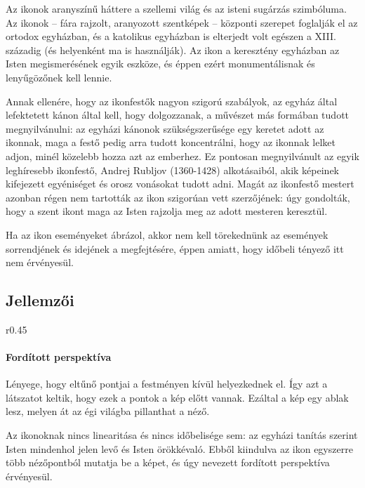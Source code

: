 Az ikonok aranyszínű háttere a szellemi világ és az isteni sugárzás szimbóluma. Az ikonok – fára rajzolt, aranyozott szentképek – központi szerepet foglalják el az ortodox egyházban, és a katolikus egyházban is elterjedt volt egészen a XIII. századig (és helyenként ma is használják). Az ikon a keresztény egyházban az Isten megismerésének egyik eszköze, és éppen ezért monumentálisnak és lenyűgözőnek kell lennie.

Annak ellenére, hogy az ikonfestők nagyon szigorú szabályok, az egyház által lefektetett kánon által kell, hogy dolgozzanak, a művészet más formában tudott megnyilvánulni: az egyházi kánonok szükségszerűsége egy keretet adott az ikonnak, maga a festő pedig arra tudott koncentrálni, hogy az ikonnak lelket adjon, minél közelebb hozza azt az emberhez. Ez pontosan megnyilvánult az egyik leghíresebb ikonfestő, Andrej Rubljov (1360-1428) alkotásaiból, akik képeinek kifejezett egyéniséget és orosz vonásokat tudott adni. Magát az ikonfestő mestert azonban régen nem tartották az ikon szigorúan vett szerzőjének: úgy gondolták, hogy a szent ikont maga az Isten rajzolja meg az adott mesteren keresztül.

Ha az ikon eseményeket ábrázol, akkor nem kell törekednünk az események sorrendjének és idejének a megfejtésére, éppen amiatt, hogy időbeli tényező itt nem érvényesül.

\subsection*{Jellemzői}

\begin{wrapfigure}{r}{0.45\textwidth}
\end{wrapfigure}

\paragraph{Fordított perspektíva}
Lényege, hogy eltűnő pontjai a festményen kívül helyezkednek el. Így azt a látszatot keltik, hogy ezek a pontok a kép előtt vannak. Ezáltal a kép egy ablak lesz, melyen át az égi világba pillanthat a néző.

Az ikonoknak nincs linearitása és nincs időbelisége sem: az egyházi tanítás szerint Isten mindenhol jelen levő és Isten örökkévaló. Ebből kiindulva az ikon egyszerre több nézőpontból mutatja be a képet, és úgy nevezett fordított perspektíva érvényesül.

